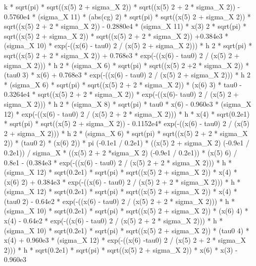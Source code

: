 \begin{maplegroup}
k * sqrt(pi) * sqrt((x(5)  2 + sigma\_X  2)) * sqrt((x(5)  2 + 2 * sigma\_X  2)) - 0.5760e4 * (sigma\_X  11) * (abs(cg)  2) * sqrt(pi) * sqrt((x(5)  2 + sigma\_X  2)) * sqrt((x(5)  2 + 2 * sigma\_X  2)) - 0.2880e4 * (sigma\_X  11) * x(3)  2 * sqrt(pi) * sqrt((x(5)  2 + sigma\_X  2)) * sqrt((x(5)  2 + 2 * sigma\_X  2)) +0.384e3 * (sigma\_X  10) * exp(-((x(6) - tau0)  2 / (x(5)  2 + sigma\_X  2))) * h  2 * sqrt(pi) * sqrt((x(5)  2 + 2 * sigma\_X  2)) + 0.768e3 * exp(-((x(6) - tau0)  2 / (x(5)  2 + sigma\_X  2))) * h  2 * (sigma\_X  6) * sqrt(pi) * sqrt((x(5)  2 +2 * sigma\_X  2)) * (tau0  3) * x(6) + 0.768e3 * exp(-((x(6) - tau0)  2 / (x(5)  2 + sigma\_X  2))) * h  2 * (sigma\_X  6) * sqrt(pi) * sqrt((x(5)  2 + 2 * sigma\_X  2)) * (x(6)  3) * tau0 - 0.3264e4 * sqrt((x(5)  2 + 2 * sigma\_X  2)) * exp(-((x(6)- tau0)  2 / (x(5)  2 + sigma\_X  2))) * h  2 * (sigma\_X  8) * sqrt(pi) * tau0 * x(6) - 0.960e3 * (sigma\_X  12) * exp(-((x(6) - tau0)  2 / (x(5)  2 + 2 * sigma\_X  2))) * h * x(4) * sqrt(0.2e1) * sqrt(pi) * sqrt((x(5)  2 + sigma\_X  2)) - 0.1152e4* exp(-((x(6) - tau0)  2 / (x(5)  2 + sigma\_X  2))) * h  2 * (sigma\_X  6) * sqrt(pi) * sqrt((x(5)  2 + 2 * sigma\_X  2)) * (tau0  2) * (x(6)  2)) * pi  (-0.1e1 / 0.2e1) * ((x(5)  2 + sigma\_X  2)  (-0.9e1 / 0.2e1)) / sigma\_X * ((x(5)  2 + 2 *sigma\_X  2)  (-0.9e1 / 0.2e1)) * (x(5)  6) / 0.8e1 - (0.384e3 * exp(-((x(6) - tau0)  2 / (x(5)  2 + 2 * sigma\_X  2))) * h * (sigma\_X  12) * sqrt(0.2e1) * sqrt(pi) * sqrt((x(5)  2 + sigma\_X  2)) * x(4) * (x(6)  2) + 0.384e3 * exp(-((x(6) - tau0) 2 / (x(5)  2 + 2 * sigma\_X  2))) * h * (sigma\_X  12) * sqrt(0.2e1) * sqrt(pi) * sqrt((x(5)  2 + sigma\_X  2)) * x(4) * (tau0  2) - 0.64e2 * exp(-((x(6) - tau0)  2 / (x(5)  2 + 2 * sigma\_X  2))) * h * (sigma\_X  10) * sqrt(0.2e1) * sqrt(pi) * sqrt((x(5)  2 + sigma\_X  2)) * (x(6)  4) * x(4) - 0.64e2 * exp(-((x(6) - tau0)  2 / (x(5)  2 + 2 * sigma\_X  2))) * h * (sigma\_X  10) * sqrt(0.2e1) * sqrt(pi) * sqrt((x(5)  2 + sigma\_X  2)) * (tau0  4) * x(4) + 0.960e3 * (sigma\_X  12) * exp(-((x(6) -tau0)  2 / (x(5)  2 + 2 * sigma\_X  2))) * h * sqrt(0.2e1) * sqrt(pi) * sqrt((x(5)  2 + sigma\_X  2)) * x(6) * x(3) - 0.960e3 
\end{maplegroup}
